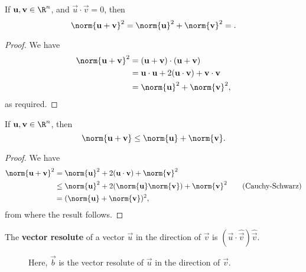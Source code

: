 \begin{theorem}
  If $\vec{u}, \vec{v} \in \R^n$, and $\vec{u}\cdot \vec{v} = 0$, then \[
    \norm{\vec{u} + \vec{v}}^2 = \norm{\vec{u}}^2 + \norm{\vec{v}}^2 = 
  .\] 
\end{theorem}
\begin{proof}
  We have
  \begin{align*}
    \norm{\vec{u} + \vec{v}}^2 &= (\vec{u} + \vec{v})\cdot (\vec{u} + \vec{v}) \\
                               &= \vec{u}\cdot \vec{u} + 2(\vec{u}\cdot \vec{v}) + \vec{v}\cdot \vec{v} \\
                               &= \norm{\vec{u}}^2 + \norm{\vec{v}}^2,
  \end{align*} as required.
\end{proof}
\begin{theorem}
  If $\vec{u}, \vec{v} \in \R^n$, then \[
    \norm{\vec{u}+\vec{v}} \le \norm{\vec{u}} + \norm{\vec{v}}
  .\] 
\end{theorem}
\begin{proof}
  We have 
  \begin{align*}
    \norm{\vec{u} + \vec{v}}^2 &= \norm{\vec{u}}^2 + 2(\vec{u}\cdot \vec{v}) + \norm{\vec{v}}^2 \\
                               &\le \norm{\vec{u}}^2 + 2(\norm{\vec{u}}\norm{\vec{v}}) + \norm{\vec{v}}^2 \tag{Cauchy-Schwarz}\\
                               &= (\norm{\vec{u}} + \norm{\vec{v}})^2,
  \end{align*} from where the result follows.
\end{proof}
\begin{definition}
  The \textbf{vector resolute} of a vector $\vec{u}$ in the direction of $\vec{v}$ is $(\vec{u}\cdot \hat{\vec{v}})\hat{\vec{v}}$.
\end{definition}
\begin{figure}[H]
    \centering
  \caption{Here, $\vec{b}$ is the vector resolute of $\vec{u}$ in the direction of $\vec{v}$.}
\end{figure}
